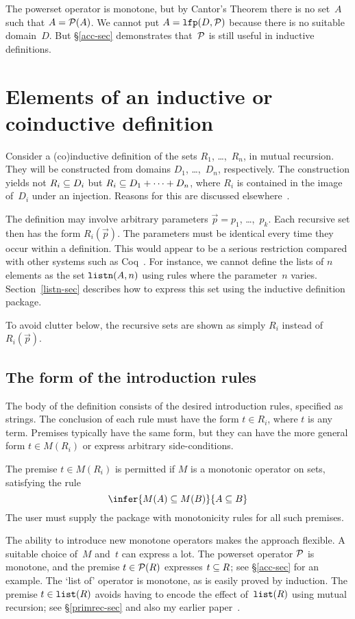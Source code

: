 The powerset operator is monotone, but by Cantor's Theorem there is no
set~$A$ such that $A={\cal P}(A)$.  We cannot put $A=\hbox{\tt lfp}(D,{\cal P})$ because
there is no suitable domain~$D$.  But \S\ref{acc-sec} demonstrates
that~${\cal P}$ is still useful in inductive definitions.

\section{Elements of an inductive or coinductive definition}\label{basic-sec}
Consider a (co)inductive definition of the sets $R_1$, \ldots,~$R_n$, in
mutual recursion.  They will be constructed from domains $D_1$,
\ldots,~$D_n$, respectively.  The construction yields not $R_i\subseteq D_i$ but
$R_i\subseteq D_1+\cdots+D_n$, where $R_i$ is contained in the image of~$D_i$
under an injection.  Reasons for this are discussed
elsewhere~\cite[\S4.5]{paulson-set-II}.

The definition may involve arbitrary parameters $\vec{p}=p_1$,
\ldots,~$p_k$.  Each recursive set then has the form $R_i(\vec{p})$.  The
parameters must be identical every time they occur within a definition.  This
would appear to be a serious restriction compared with other systems such as
Coq~\cite{paulin92}.  For instance, we cannot define the lists of
$n$ elements as the set $\hbox{\tt listn}(A,n)$ using rules where the parameter~$n$
varies.  Section~\ref{listn-sec} describes how to express this set using the
inductive definition package.

To avoid clutter below, the recursive sets are shown as simply $R_i$
instead of $R_i(\vec{p})$.

\subsection{The form of the introduction rules}\label{intro-sec}
The body of the definition consists of the desired introduction rules,
specified as strings.  The conclusion of each rule must have the form $t\in
R_i$, where $t$ is any term.  Premises typically have the same form, but
they can have the more general form $t\in M(R_i)$ or express arbitrary
side-conditions.

The premise $t\in M(R_i)$ is permitted if $M$ is a monotonic operator on
sets, satisfying the rule 
\[ \infer{M(A)\sbs M(B)}{A\sbs B} \]
The user must supply the package with monotonicity rules for all such premises.

The ability to introduce new monotone operators makes the approach
flexible.  A suitable choice of~$M$ and~$t$ can express a lot.  The
powerset operator ${\cal P}$ is monotone, and the premise $t\in{\cal P}(R)$
expresses $t\subseteq R$; see \S\ref{acc-sec} for an example.  The `list of'
operator is monotone, as is easily proved by induction.  The premise
$t\in\hbox{\tt list}(R)$ avoids having to encode the effect of~$\hbox{\tt list}(R)$ using mutual
recursion; see \S\ref{primrec-sec} and also my earlier
paper~\cite[\S4.4]{paulson-set-II}.

